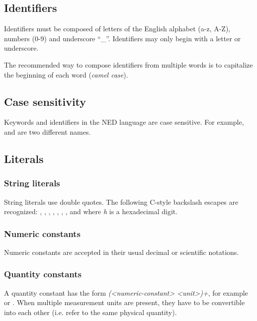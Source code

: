 \subsection{Identifiers}

Identifiers must be composed of letters of the English alphabet (a-z, A-Z),
numbers (0-9) and underscore ``\_''. Identifiers may only begin with a
letter or underscore.

The recommended way to compose identifiers from multiple words is to
capitalize the beginning of each word (\textit{camel case}).


\subsection{Case sensitivity}

Keywords and identifiers in the NED language are case sensitive. For example,
 and  are two different names.


\subsection{Literals}

\subsubsection{String literals}

String literals use double quotes. The following C-style backslash
escapes are recognized: , , , ,
, \ttt{{\textbackslash}{\textbackslash}}, , and  where \textit{h} is a
hexadecimal digit.

\subsubsection{Numeric constants}

Numeric constants are accepted in their usual decimal or
scientific notations.

\subsubsection{Quantity constants}

A quantity constant has the form \textit{(<numeric-constant> <unit>)+}, for
example  or . When multiple measurement
units are present, they have to be convertible into each other (i.e. refer
to the same physical quantity).

